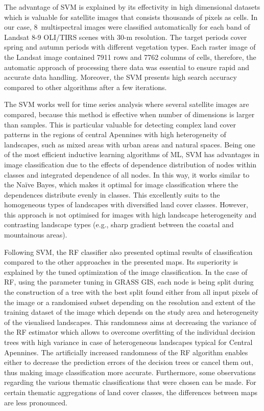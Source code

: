 \documentclass[jimaging,article,accept,pdftex,oneauthor]{Definitions/mdpi}
\begin{document}
{The advantage} of SVM is explained by its effectivity in high dimensional datasets which is valuable for satellite images that consists thousands of pixels as cells. In our case, 8~multispectral images were classified automatically for each band of Landsat 8-9 OLI/TIRS scenes with 30-m resolution. The target periods cover spring and autumn periods with different vegetation types. Each raster image of the Landsat image contained 7911 rows and 7762 columns of cells, therefore, the automatic approach of processing there data was essential to ensure rapid and accurate data handling. Moreover, the SVM presents high search accuracy compared to other algorithms after a few iterations. 

{The }SVM {works well } for time series analysis where several satellite images are compared{, because} this method is effective when number of dimensions is larger than samples. This is particular valuable for detecting complex land cover patterns in the regions of central Apennines with high heterogeneity of landscapes, such as mixed areas with urban areas and natural spaces. Being one of the most efficient inductive learning algorithms of ML{, }SVM has advantages in {image} classification{ }due to the effects of dependence distribution of nodes within classes and integrated dependence of all nodes. In this way, it works similar to the Naïve Bayes, {which makes it} optimal for {image }classification where the dependences distribute evenly in classes{. This} excellently suits to the homogeneous types of landscapes with diversified land cover classes. However, this approach is not optimised for images with high landscape heterogeneity and contrasting landscape types (e.g., sharp gradient between the coastal and mountainous areas). 

{Following SVM, the RF} classifier also presented optimal results of classification compared to the other approaches in the presented maps. Its superiority is explained by the tuned optimization of the image classification. In the case of RF, using the parameter tuning in GRASS GIS, each node is being split during the construction of a tree with the best split found either from all input pixels of the image or a randomised subset depending on the resolution and extent of the training dataset of the image which depends on the study area and heterogeneity of the visualised landscapes. This randomness aims at decreasing the variance of the RF estimator which allows to overcome overfitting of the individual decision trees with high variance in case of heterogeneous landscapes typical for Central Apennines. The artificially increased randomness of the RF algorithm enables either to decrease the prediction errors of the decision trees or cancel them out, thus making image classification more accurate. Furthermore, some observations regarding the various thematic classifications that were chosen can be made. For certain thematic aggregations of land cover classes, the differences between maps are less pronounced.
\end{document}
